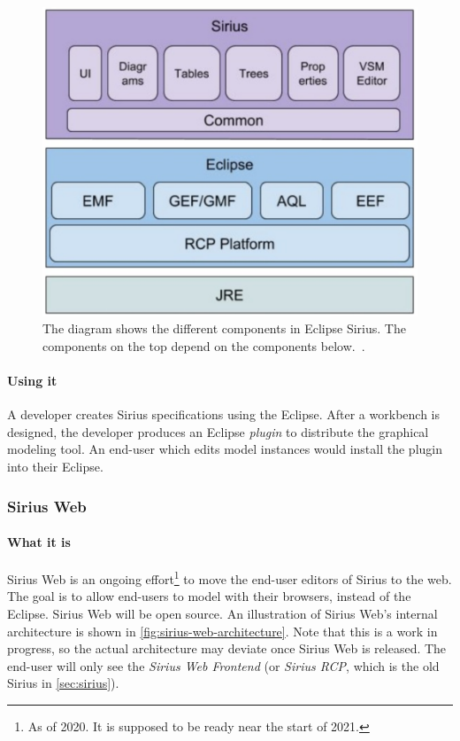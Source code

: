 \begin{figure}[htbp]  %
  \centering
  \includegraphics[width=\textwidth]{figures/Sirius_architecture}
  \caption[The Sirius Architecture]{The diagram shows the different components in Eclipse Sirius. The components on the top depend on the components below.~\cite[p.~36]{davidSiriusCon2018Sirius2018}.}\label{fig:sirius-architecture}
\end{figure}

\paragraph*{Using it} A developer creates Sirius specifications using the \gls{Eclipse}.
After a workbench is designed, the developer produces an Eclipse \emph{plugin} to distribute the graphical modeling tool. An end-user which edits model instances would install the plugin into their \gls{Eclipse}.


\subsubsection{Sirius Web}\label{sec:sirius-web}

\paragraph*{What it is}
Sirius Web is an ongoing effort\footnote{As of 2020. It is supposed to be ready near the start of 2021.} to move the end-user editors of Sirius to the web.
The goal is to allow end-users to model with their browsers, instead of the \gls{Eclipse}.
Sirius Web will be \gls{open source}.
An illustration of Sirius Web's internal architecture is shown in \cref{fig:sirius-web-architecture}. Note that this is a work in progress, so the actual architecture may deviate once Sirius Web is released.
The end-user will only see the \emph{Sirius Web Frontend} (or \emph{Sirius \acrshort{RCP}}, which is the old Sirius in \cref{sec:sirius}).

